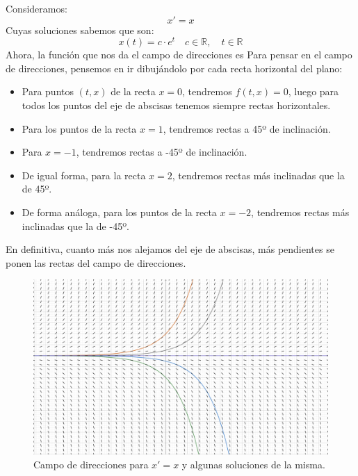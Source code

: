 \begin{ejemplo}
    Consideramos:
    \begin{equation*}
        x'=x
    \end{equation*}
    Cuyas soluciones sabemos que son:
    \begin{equation*}
        x(t) = c\cdot e^{t} \quad c\in \mathbb{R}, \quad t\in \mathbb{R}
    \end{equation*}
    Ahora, la función que nos da el campo de direcciones es
    Para pensar en el campo de direcciones, pensemos en ir dibujándolo por cada recta horizontal del plano:
    \begin{itemize}
        \item Para puntos $(t,x)$ de la recta $x=0$, tendremos $f(t,x) = 0$, luego para todos los puntos del eje de abscisas tenemos siempre rectas horizontales.
        \item Para los puntos de la recta $x=1$, tendremos rectas a 45º de inclinación.
        \item Para $x=-1$, tendremos rectas a -45º de inclinación.
        \item De igual forma, para la recta $x=2$, tendremos rectas más inclinadas que la de 45º.
        \item De forma análoga, para los puntos de la recta $x=-2$, tendremos rectas más inclinadas que la de -45º.
    \end{itemize}
    En definitiva, cuanto más nos alejamos del eje de abscisas, más pendientes se ponen las rectas del campo de direcciones.

\ifdefined\showimages
    \begin{figure}[H]
        \centering
        \includegraphics[width=0.6\linewidth]{Imagenes/campo_direcciones_3.png}
        \caption{Campo de direcciones para $x'=x$ y algunas soluciones de la misma.}
    \end{figure}
\fi
\end{ejemplo}

